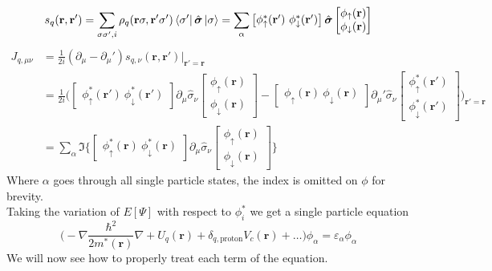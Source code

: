 \begin{equation}
    s_q(\mathbf r, \mathbf r') =\sum_{\sigma \sigma', i} \rho_q(\mathbf r \sigma, \mathbf r' \sigma')\bra{\sigma'} \hat {\boldsymbol{\sigma}} \ket{\sigma} = \sum_{\alpha} \begin{bmatrix} \phi_{\uparrow}^*(\mathbf r') \ \phi_{\downarrow}^*(\mathbf r') \end{bmatrix}\hat{\boldsymbol{\sigma}} \begin{bmatrix} \phi_{\uparrow}(\mathbf r) \\ \phi_{\downarrow}(\mathbf r) \end{bmatrix}
\end{equation}
\begin{align}
    J_{q, \mu\nu} &= \frac 1 {2i}(\partial_\mu - \partial_\mu') s_{q, \nu}(\mathbf r, \mathbf r')\bigg|_{\mathbf r'=\mathbf r}\\
    &= \frac 1 {2i}\bigg(\begin{bmatrix}\phi_{\uparrow}^*(\boldsymbol r')\ \phi_{\downarrow}^*(\boldsymbol r')\end{bmatrix} \partial_\mu\hat{\sigma}_\nu\begin{bmatrix} \phi_{\uparrow}(\mathbf r) \\ \phi_{\downarrow}(\mathbf r) \end{bmatrix} - \begin{bmatrix}\phi_{\uparrow}(\boldsymbol{r})\ \phi_{\downarrow}(\boldsymbol{r})\end{bmatrix} \partial_\mu'\hat{\sigma}_\nu\begin{bmatrix} \phi_{\uparrow}^*(\mathbf r') \\ \phi_{\downarrow}^*(\mathbf r') \end{bmatrix}\bigg)_{\mathbf r'=\mathbf r}
     \\&= \sum_\alpha\Im\bigg\{\begin{bmatrix}\phi_{\uparrow}^*(\boldsymbol r)\ \phi_{\downarrow}^*(\boldsymbol r) \end{bmatrix}\partial_\mu \hat{\sigma}_\nu\begin{bmatrix} \phi_{\uparrow}(\mathbf r) \\ \phi_{\downarrow}(\mathbf r) \end{bmatrix}\bigg\}
\end{align}
Where $\alpha$ goes through all single particle states, the index is omitted on $\phi$ for brevity.
\\Taking the variation of $E[\Psi]$ with respect to $\phi_i^*$ we get a single particle equation
\begin{equation}
   \bigg(-\nabla \frac{\hbar^2}{2m^*(\mathbf r)} \nabla + U_q(\mathbf r)+\delta_{q, \text{proton}}V_c(\mathbf r)+\ldots\bigg)\phi_\alpha = \varepsilon_\alpha\phi_\alpha 
\end{equation}
We will now see how to properly treat each term of the equation.
